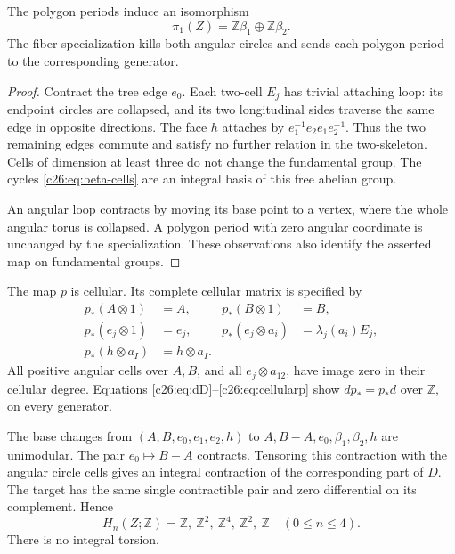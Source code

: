 \begin{lemma}\label{c26:lem:fundamental-group}
The polygon periods induce an isomorphism
\[
 \pi_1(Z)=\mathbb Z\beta_1\oplus\mathbb Z\beta_2.
\]
The fiber specialization kills both angular circles and sends each
polygon period to the corresponding generator.
\end{lemma}

\begin{proof}
Contract the tree edge $e_0$. Each two-cell $E_j$ has trivial attaching
loop: its endpoint circles are collapsed, and its two longitudinal sides
traverse the same edge in opposite directions. The face $h$ attaches by
$e_1^{-1}e_2e_1e_2^{-1}$. Thus the two remaining edges commute and
satisfy no further relation in the two-skeleton. Cells of dimension at
least three do not change the fundamental group. The cycles
\eqref{c26:eq:beta-cells} are an integral basis of this free abelian group.

An angular loop contracts by moving its base point to a vertex, where
the whole angular torus is collapsed. A polygon period with zero angular
coordinate is unchanged by the specialization. These observations also
identify the asserted map on fundamental groups.
\end{proof}

The map $p$ is cellular. Its complete cellular matrix is specified by
\begin{equation}\label{c26:eq:cellularp}
\begin{aligned}
p_*(A\otimes1)&=A,&p_*(B\otimes1)&=B,\\
p_*(e_j\otimes1)&=e_j,&
p_*(e_j\otimes a_i)&=\lambda_j(a_i)E_j,\\
p_*(h\otimes a_I)&=h\otimes a_I.&&
\end{aligned}
\end{equation}
All positive angular cells over $A,B$, and all $e_j\otimes a_{12}$,
have image zero in their cellular degree.
Equations \eqref{c26:eq:dD}--\eqref{c26:eq:cellularp} show $dp_*=p_*d$
over $\mathbb Z$, on every generator.

The base changes from $(A,B,e_0,e_1,e_2,h)$ to
$A,B-A,e_0,\beta_1,\beta_2,h$ are unimodular.
The pair $e_0\mapsto B-A$ contracts.
Tensoring this contraction with the angular circle cells gives an
integral contraction of the corresponding part of $D$.
The target has the same single contractible pair and zero differential
on its complement. Hence
\begin{equation}\label{c26:eq:homology}
H_n(Z;\mathbb Z)=\mathbb Z,\ \mathbb Z^2,\ \mathbb Z^4,\
\mathbb Z^2,\ \mathbb Z
\quad(0\le n\le4).
\end{equation}
There is no integral torsion.

